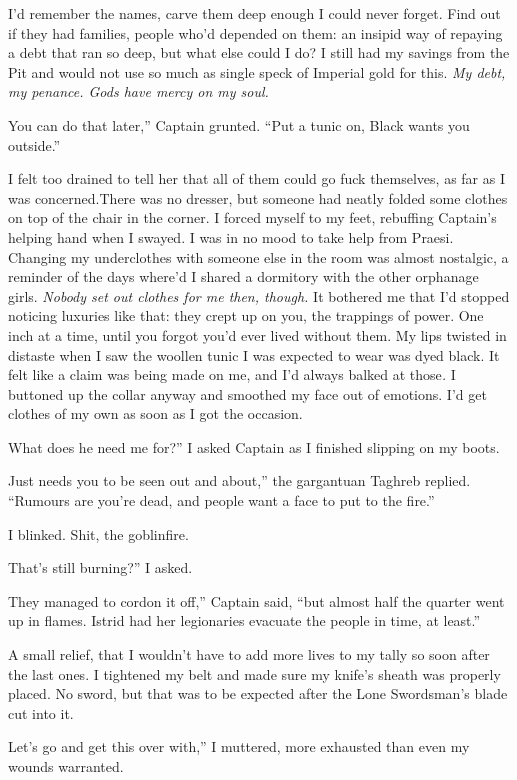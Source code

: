 \documentclass[12pt, openany]{book}
\begin{document}
I’d remember the names, carve them deep enough I could never forget. Find out if they had families, people who’d depended on them: an insipid way of repaying a debt that ran so deep, but what else could I do? I still had my savings from the Pit and would not use so much as single speck of Imperial gold for this.\textit{ }\textit{My debt, my penance. Gods have mercy on my soul.}

You can do that later,” Captain grunted. “Put a tunic on, Black wants you outside.”

I felt too drained to tell her that all of them could go fuck themselves, as far as I was concerned.There was no dresser, but someone had neatly folded some clothes on top of the chair in the corner. I forced myself to my feet, rebuffing Captain’s helping hand when I swayed. I was in no mood to take help from Praesi. Changing my underclothes with someone else in the room was almost nostalgic, a reminder of the days where’d I shared a dormitory with the other orphanage girls. \textit{Nobody set out clothes for me then, though.} It bothered me that I’d stopped noticing luxuries like that: they crept up on you, the trappings of power. One inch at a time, until you forgot you’d ever lived without them. My lips twisted in distaste when I saw the woollen tunic I was expected to wear was dyed black. It felt like a claim was being made on me, and I’d always balked at those\textit{.} I buttoned up the collar anyway and smoothed my face out of emotions. I’d get clothes of my own as soon as I got the occasion.

What does he need me for?” I asked Captain as I finished slipping on my boots.

Just needs you to be seen out and about,” the gargantuan Taghreb replied. “Rumours are you’re dead, and people want a face to put to the fire.”

I blinked. Shit, the goblinfire.

That’s still burning?” I asked.

They managed to cordon it off,” Captain said, “but almost half the quarter went up in flames. Istrid had her legionaries evacuate the people in time, at least.”

A small relief, that I wouldn’t have to add more lives to my tally so soon after the last ones. I tightened my belt and made sure my knife’s sheath was properly placed. No sword, but that was to be expected after the Lone Swordsman’s blade cut into it.

Let’s go and get this over with,” I muttered, more exhausted than even my wounds warranted.
\end{document}

